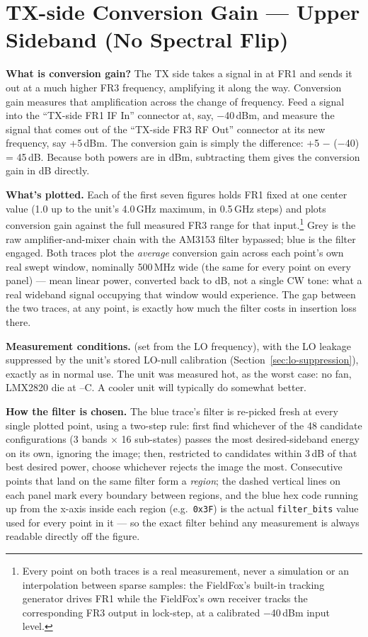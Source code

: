 \clearpage
\section{TX-side Conversion Gain --- Upper Sideband (No Spectral Flip)}
\label{sec:tx-gain-upper}

\textbf{What is conversion gain?} The TX side takes a signal in at FR1 and sends it out at a much higher FR3
frequency, amplifying it along the way. Conversion gain measures that amplification across the change of
frequency. Feed a signal into the ``TX-side FR1 IF In'' connector at, say, −40\,dBm, and measure the signal that comes out of the ``TX-side FR3 RF Out'' connector at its new frequency, say +5\,dBm. The conversion gain is simply the difference:
+5 − (−40) = 45\,dB. Because both powers are in dBm, subtracting them gives the conversion gain in dB directly.

\textbf{What's plotted.} Each of the first seven figures holds FR1 fixed at one center value (1.0 up to the
unit's 4.0\,GHz maximum, in 0.5\,GHz steps) and plots conversion gain against the full measured FR3 range for
that input.\footnote{Every point on both traces is a real measurement, never a simulation or an interpolation
between sparse samples: the FieldFox's built-in tracking generator drives FR1 while the FieldFox's own
receiver tracks the corresponding FR3 output in lock-step, at a calibrated −40\,dBm input level.} Grey is the
raw amplifier-and-mixer chain with the AM3153 filter bypassed; blue is the filter engaged. Both traces plot the
\emph{average} conversion gain across each point's own real swept window, nominally 500\,MHz wide (the same for
every point on every panel) --- mean linear power, converted back to dB, not a single CW tone: what a real
wideband signal occupying that window would experience. The gap between the two traces, at any point, is
exactly how much the filter costs in insertion loss there.

\textbf{Measurement conditions.} \lmxDriveRule{} (set from the LO frequency), with the LO leakage suppressed by the unit's stored LO-null calibration (Section~\ref{sec:lo-suppression}), exactly as in normal use. The unit was measured hot, as the worst case: no fan, LMX2820 die at \condGainMinC--\condGainMaxC\textdegree C. A cooler unit will typically do somewhat better.

\textbf{How the filter is chosen.} The blue trace's filter is re-picked fresh at every single plotted point,
using a two-step rule: first find whichever of the 48 candidate configurations (3 bands × 16 sub-states)
passes the most desired-sideband energy on its own, ignoring the image; then, restricted to candidates within
3\,dB of that best desired power, choose whichever rejects the image the most. Consecutive points that land on
the same filter form a \emph{region}; the dashed vertical lines on each panel mark every boundary between
regions, and the blue hex code running up from the x-axis inside each region (e.g.\ \texttt{0x3F}) is the
actual \texttt{filter\_bits} value used for every point in it --- so the exact filter behind any measurement is
always readable directly off the figure.

